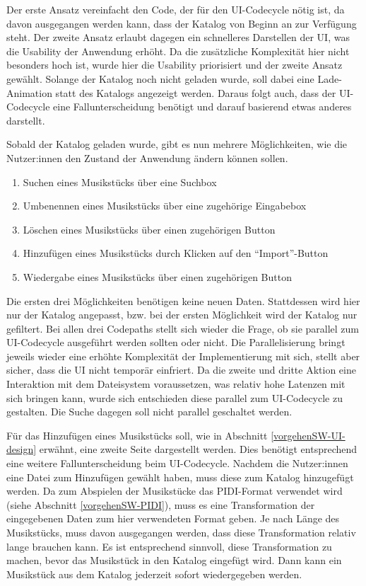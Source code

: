 Der erste Ansatz vereinfacht den Code, der für den UI-Codecycle nötig ist, da davon ausgegangen werden kann, dass der Katalog von Beginn an zur Verfügung steht.
Der zweite Ansatz erlaubt dagegen ein schnelleres Darstellen der \ac{UI}, was die Usability der Anwendung erhöht.
Da die zusätzliche Komplexität hier nicht besonders hoch ist, wurde hier die Usability priorisiert und der zweite Ansatz gewählt.
Solange der Katalog noch nicht geladen wurde, soll dabei eine Lade-Animation statt des Katalogs angezeigt werden.
Daraus folgt auch, dass der UI-Codecycle eine Fallunterscheidung benötigt und darauf basierend etwas anderes darstellt.

Sobald der Katalog geladen wurde, gibt es nun mehrere Möglichkeiten, wie die Nutzer:innen den Zustand der Anwendung ändern können sollen.
\begin{enumerate}
    \item Suchen eines Musikstücks über eine Suchbox
    \item Umbenennen eines Musikstücks über eine zugehörige Eingabebox
    \item Löschen eines Musikstücks über einen zugehörigen Button
    \item Hinzufügen eines Musikstücks durch Klicken auf den \enquote{Import}-Button
    \item Wiedergabe eines Musikstücks über einen zugehörigen Button
\end{enumerate}

Die ersten drei Möglichkeiten benötigen keine neuen Daten.
Stattdessen wird hier nur der Katalog angepasst, bzw. bei der ersten Möglichkeit wird der Katalog nur gefiltert. \newline
Bei allen drei Codepaths stellt sich wieder die Frage, ob sie parallel zum UI-Codecycle ausgeführt werden sollten oder nicht.
Die Parallelisierung bringt jeweils wieder eine erhöhte Komplexität der Implementierung mit sich, stellt aber sicher, dass die \ac{UI} nicht temporär einfriert.
Da die zweite und dritte Aktion eine Interaktion mit dem Dateisystem voraussetzen, was relativ hohe Latenzen mit sich bringen kann, wurde sich entschieden diese parallel zum UI-Codecycle zu gestalten.
Die Suche dagegen soll nicht parallel geschaltet werden.

Für das Hinzufügen eines Musikstücks soll, wie in Abschnitt \ref{vorgehenSW-UI-design} erwähnt, eine zweite Seite dargestellt werden.
Dies benötigt entsprechend eine weitere Fallunterscheidung beim UI-Codecycle.
Nachdem die Nutzer:innen eine Datei zum Hinzufügen gewählt haben, muss diese zum Katalog hinzugefügt werden.
Da zum Abspielen der Musikstücke das \ac{PIDI}-Format verwendet wird (siehe Abschnitt \ref{vorgehenSW-PIDI}), muss es eine Transformation der eingegebenen Daten zum hier verwendeten Format geben.
Je nach Länge des Musikstücks, muss davon ausgegangen werden, dass diese Transformation relativ lange brauchen kann.
Es ist entsprechend sinnvoll, diese Transformation zu machen, bevor das Musikstück in den Katalog eingefügt wird.
Dann kann ein Musikstück aus dem Katalog jederzeit sofort wiedergegeben werden.

